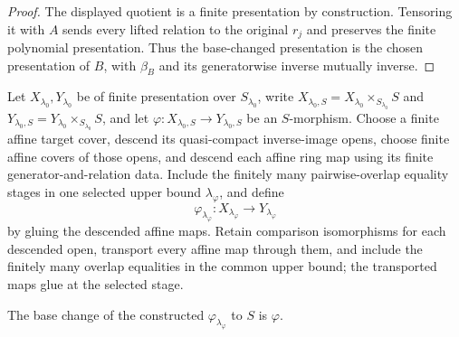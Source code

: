 \begin{proof}
  The displayed quotient is a finite presentation by construction.  Tensoring
  it with $A$ sends every lifted relation to the original $r_j$ and preserves
  the finite polynomial presentation.  Thus the base-changed presentation is
  the chosen presentation of $B$, with $\beta_B$ and its generatorwise inverse
  mutually inverse.
\end{proof}

\begin{definition}
  \label{def:nagata-morphism-descent}

  Let $X_{\lambda_0},Y_{\lambda_0}$ be of finite presentation over
  $S_{\lambda_0}$, write
  $X_{\lambda_0,S}=X_{\lambda_0}\times_{S_{\lambda_0}}S$ and
  $Y_{\lambda_0,S}=Y_{\lambda_0}\times_{S_{\lambda_0}}S$, and let
  $\varphi\colon X_{\lambda_0,S}\to Y_{\lambda_0,S}$ be an $S$-morphism.
  Choose a finite affine target cover, descend its quasi-compact inverse-image
  opens, choose finite affine covers of those opens, and descend each affine
  ring map using its finite generator-and-relation data.  Include the finitely
  many pairwise-overlap equality stages in one selected upper bound
  $\lambda_\varphi$, and define
  \[
    \varphi_{\lambda_\varphi}\colon
      X_{\lambda_\varphi}\longrightarrow Y_{\lambda_\varphi}
  \]
  by gluing the descended affine maps.
  Retain comparison isomorphisms for each descended open, transport every
  affine map through them, and include the finitely many overlap equalities in
  the common upper bound; the transported maps glue at the selected stage.
\end{definition}

\begin{lemma}
  \label{lemma:nagata-morphism-descends}

  The base change of the constructed
  $\varphi_{\lambda_\varphi}$ to $S$ is $\varphi$.
\end{lemma}

